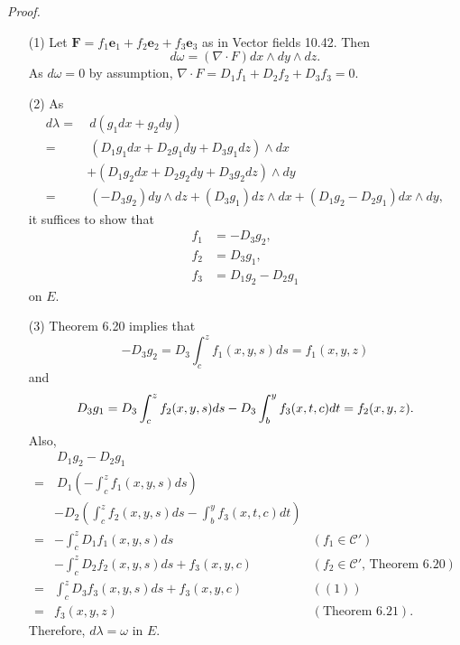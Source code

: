 \documentclass{article}
\begin{document}
\emph{Proof.}
\begin{enumerate}
\item[(1)]
  Let $\mathbf{F} = f_1 \mathbf{e}_1 + f_2 \mathbf{e}_2 + f_3 \mathbf{e}_3$
  as in Vector fields 10.42.
  Then
  \[
    d\omega = (\nabla \cdot F) dx \wedge dy \wedge dz.
  \]
  As $d\omega = 0$ by assumption, $\nabla \cdot F = D_1 f_1 + D_2 f_2 + D_3 f_3 = 0$.

\item[(2)]
  As
  \begin{align*}
    d\lambda
    =& \: d(g_1 dx + g_2 dy) \\
    =& \: (D_1g_1 dx + D_2g_1 dy + D_3g_1 dz) \wedge dx \\
      &+ (D_1g_2 dx + D_2g_2 dy + D_3g_2 dz) \wedge dy \\
    =& \: (-D_3 g_2) dy \wedge dz
      + (D_3 g_1) dz \wedge dx + (D_1 g_2 - D_2 g_1) dx \wedge dy,
  \end{align*}
  it suffices to show that
  \begin{align*}
    f_1 &= -D_3 g_2, \\
    f_2 &= D_3 g_1, \\
    f_3 &= D_1 g_2 - D_2 g_1
  \end{align*}
  on $E$.

\item[(3)]
  Theorem 6.20 implies that
  \[
    -D_3 g_2 = D_3 \int_{c}^{z} f_1(x,y,s) ds = f_1(x,y,z)
  \]
  and
  \[
    D_3 g_1
    = D_3 \int_{c}^{z} f_2(x,y,s) ds - D_3 \int_{b}^{y} f_3(x,t,c)dt \\
    = f_2(x,y,z).
  \]
  Also,
  \begin{align*}
    & \: D_1 g_2 - D_2 g_1 \\
    =& \: D_1 \left( -\int_{c}^{z} f_1(x,y,s) ds \right) \\
      &- D_2 \left( \int_{c}^{z} f_2(x,y,s) ds - \int_{b}^{y} f_3(x,t,c)dt \right) \\
    =& - \int_{c}^{z} D_1 f_1(x,y,s) ds
      &(f_1 \in \mathscr{C}') \\
      &- \int_{c}^{z} D_2 f_2(x,y,s) ds + f_3(x,y,c)
        &(\text{$f_2 \in \mathscr{C}'$, Theorem 6.20}) \\
    =& \int_{c}^{z} D_3 f_3(x,y,s) ds + f_3(x,y,c)
      &((1)) \\
    =& f_3(x,y,z)
      &(\text{Theorem 6.21}).
  \end{align*}
  Therefore, $d\lambda = \omega$ in $E$.


\end{enumerate}
\end{document}
